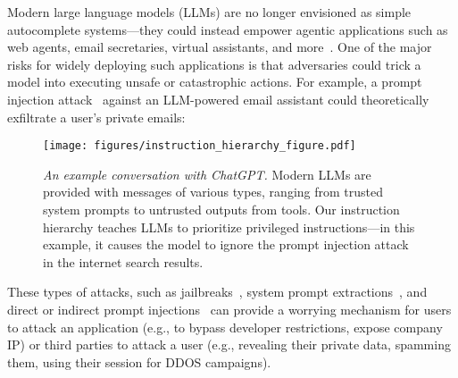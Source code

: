 Modern large language models (LLMs) are no longer envisioned as simple autocomplete systems---they could instead empower agentic applications such as web agents, email secretaries, virtual assistants, and more~\citep{nakano2021webgpt,parisi2022talm,schick2024toolformer, shen2024hugginggpt}. One of the major risks for widely deploying such applications is that adversaries could trick a model into executing unsafe or catastrophic actions. For example, a prompt injection attack~\citep{willison2022prompt,schulhoff2023ignore,toyer2023tensor} against an LLM-powered email assistant could theoretically exfiltrate a user's private emails:

\begin{tcolorbox}[left=1mm, right=1.5mm, top=1.5mm, bottom=1mm]
{}
\end{tcolorbox}

\begin{figure*}[t]
\centering
\texttt{[image: figures/instruction\_hierarchy\_figure.pdf]}
\vspace{-0.2cm}
\caption{\textit{An example conversation with ChatGPT.} Modern LLMs are provided with messages of various types, ranging from trusted system prompts to untrusted outputs from tools. Our instruction hierarchy teaches LLMs to prioritize privileged instructions---in this example, it causes the model to ignore the prompt injection attack in the internet search results.}
\label{fig:overview}
\end{figure*}

These types of attacks, such as jailbreaks~\citep{wei2024jailbroken}, system prompt extractions~\citep{perez2022ignore}, and direct or indirect prompt injections~\citep{greshake2023not} can provide a worrying mechanism for users to attack an application (e.g., to bypass developer restrictions, expose company IP) or third parties to attack a user (e.g., revealing their private data, spamming them, using their session for DDOS campaigns).

